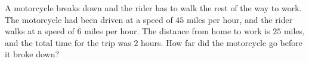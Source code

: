 A motorcycle breaks down and the rider has to walk the rest of the way to work. The motorcycle had been driven at a speed of $45$ miles per hour, and the rider walks at a speed of $6$ miles per hour. The distance from home to work is $25$ miles, and the total time for the trip was $2$ hours. How far did the motorcycle go before it broke down?
